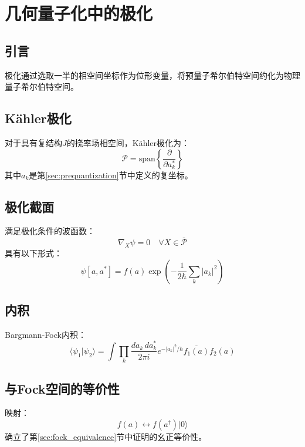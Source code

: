 \section{几何量子化中的极化}
\label{sec:polarization}

\subsection{引言}

极化通过选取一半的相空间坐标作为位形变量，将预量子希尔伯特空间约化为物理量子希尔伯特空间。

\subsection{Kähler极化}

\begin{definition}[Kähler极化]
对于具有复结构$J$的挠率场相空间，Kähler极化为：
\begin{equation}
    \mathcal{P} = \text{span}\left\{ \frac{\partial}{\partial a_k^*} \right\}
\end{equation}
其中$a_k$是第\ref{sec:prequantization}节中定义的复坐标。
\end{definition}

\subsection{极化截面}

满足极化条件的波函数：
\begin{equation}
    \nabla_X \psi = 0 \quad \forall X \in \bar{\mathcal{P}}
\end{equation}
具有以下形式：
\begin{equation}
    \psi[a, a^*] = f(a) \exp\left(-\frac{1}{2\hbar} \sum_k |a_k|^2\right)
\end{equation}

\subsection{内积}

Bargmann-Fock内积：
\begin{equation}
    \langle \psi_1 | \psi_2 \rangle = \int \prod_k \frac{da_k \, da_k^*}{2\pi i} e^{-|a_k|^2/\hbar} \overline{f_1(a)} f_2(a)
\end{equation}

\subsection{与Fock空间的等价性}

映射：
\begin{equation}
    f(a) \longleftrightarrow f(a^\dagger) |0\rangle
\end{equation}
确立了第\ref{sec:fock_equivalence}节中证明的幺正等价性。

